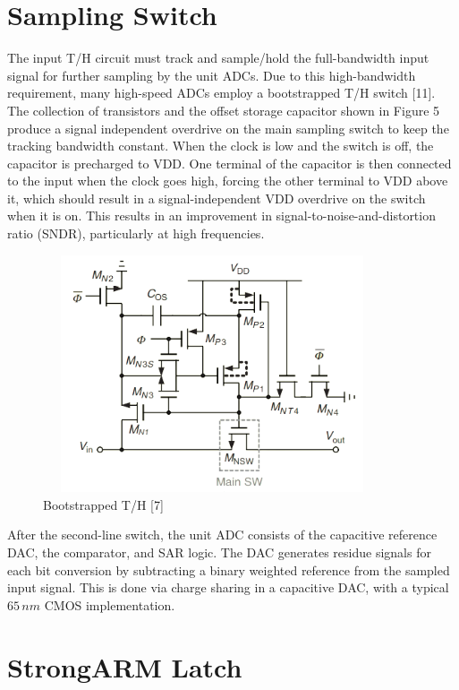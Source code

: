 \section{Sampling Switch}

The input T/H circuit must track 
and sample/hold the full-bandwidth 
input signal for further sampling by 
the unit ADCs. Due to this high-bandwidth requirement, many high-speed 
ADCs employ a bootstrapped T/H 
switch [11]. The collection of transistors and the offset storage capacitor 
shown in Figure 5 produce a signal independent overdrive on the main 
sampling switch to keep the tracking bandwidth constant. When the 
clock is low and the switch is off, the 
capacitor is precharged to VDD. One 
terminal of the capacitor is then connected to the input when the clock 
goes high, forcing the other terminal 
to VDD above it, which should result 
in a signal-independent VDD overdrive on the switch when it is on. This 
results in an improvement in signal-to-noise-and-distortion ratio (SNDR), 
particularly at high frequencies.

\begin{figure}[h]
	\centering
	\includegraphics[width=10cm,height=7cm]{fig3_3.png}
	\caption{Bootstrapped T/H [7]}
	\label{TI-ADC}
\end{figure}

After the second-line switch, the 
unit ADC consists of the capacitive 
reference DAC, the comparator, and 
SAR logic. The DAC generates residue 
signals for each bit conversion by 
subtracting a binary weighted reference from the sampled input signal. 
This is done via charge sharing in a 
capacitive DAC, with a typical $65\,nm$ 
CMOS implementation.



\section{StrongARM Latch}
\label{StrongARM Latch}


